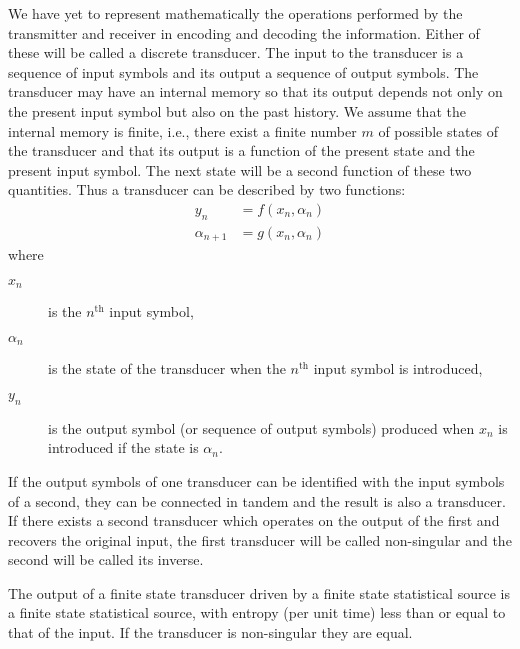 We have yet to represent mathematically the operations performed by
the transmitter and receiver in encoding and decoding the information.
Either of these will be called a discrete transducer.  The input to the
transducer is a sequence of input symbols and its output a sequence of
output symbols.  The transducer may have an internal memory so that
its output depends not only on the present input symbol but also on
the past history.  We assume that the internal memory is finite, i.e.,
there exist a finite number $m$ of possible states of the transducer and
that its output is a function of the present state and the present input
symbol.  The next state will be a second function of these two quantities.
Thus a transducer can be described by two functions:
\begin{align*}
y_n &= f(x_n, \alpha_n) \\
\alpha_{n+1} &= g(x_n, \alpha_n)
\end{align*}
where
\begin{description}
\item[$x_n$] is the $n^{\text{th}}$ input symbol,
\item[$\alpha_n$] is the state of the transducer when the $n^{\text{th}}$
input symbol is
introduced,
\item[$y_n$] is the output symbol (or sequence of output symbols)
produced when $x_n$ is introduced if the state is $\alpha_n$.
\end{description}

If the output symbols of one transducer can be identified with the input
symbols of a second, they can be connected in tandem and the result is
also a transducer.  If there exists a second transducer which operates
on the output of the first and recovers the original input, the first
transducer will be called non-singular and the second will be called
its inverse.

\begin{theorem}
\label{thm:7}
The output of a finite state transducer driven by a finite state
statistical source is a finite state statistical source, with entropy
(per unit time) less than or equal to that of the input.  If the
transducer is non-singular they are equal.
\end{theorem}

